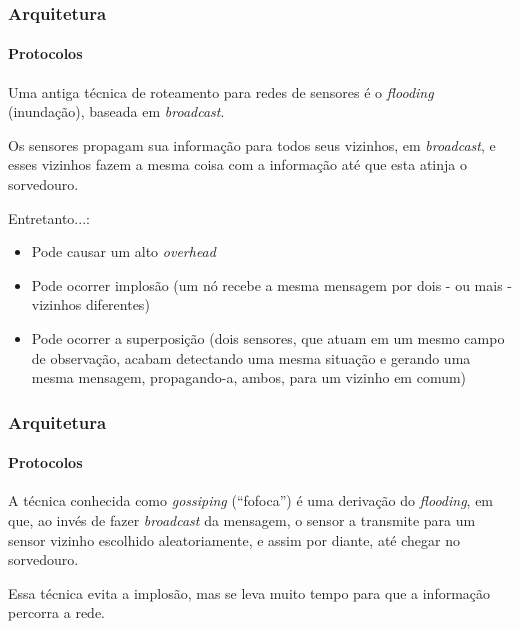 \documentclass[notes]{beamer}
\begin{document}
\begin{frame}
\frametitle{Arquitetura}
\framesubtitle{Protocolos}

\begin{block}

Uma antiga técnica de roteamento para redes de sensores é o \textit{flooding} (inundação), baseada em \textit{broadcast}. 

\end{block} \pause

\begin{block}

Os sensores propagam sua informação para todos seus vizinhos, em \textit{broadcast}, e esses vizinhos fazem a mesma coisa com a informação até que esta atinja o sorvedouro.

\end{block} \pause

\begin{alertblock}

Entretanto...: \pause

\begin{itemize}

\item Pode causar um alto \textit{overhead} \pause

\item Pode ocorrer implosão (um nó recebe a mesma mensagem por dois - ou mais - vizinhos diferentes) \pause

\item Pode ocorrer a superposição (dois sensores, que atuam em um mesmo campo de observação, acabam detectando uma mesma situação e gerando uma mesma mensagem, propagando-a, ambos, para um vizinho em comum)

\end{itemize}

\end{alertblock}

\end{frame}

\begin{frame}
\frametitle{Arquitetura}
\framesubtitle{Protocolos}

\begin{block}

A técnica conhecida como \textit{gossiping} (“fofoca”) é uma derivação do \textit{flooding}, em que, ao invés de fazer \textit{broadcast} da mensagem, o sensor a transmite para um sensor vizinho escolhido aleatoriamente, e assim por diante, até chegar no sorvedouro.

\end{block} \pause

\begin{alertblock}

Essa técnica evita a implosão, mas se leva muito tempo para que a informação percorra a rede.  

\end{alertblock}

\end{frame}
\end{document}

